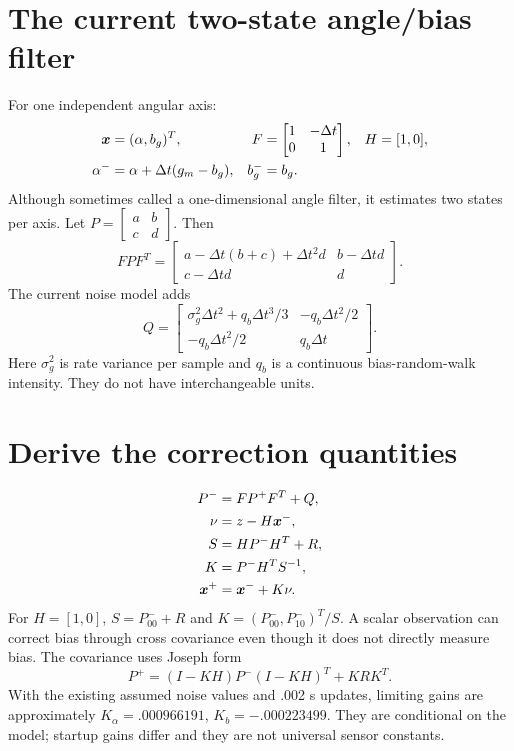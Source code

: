 \section{The current two-state angle/bias filter}
For one independent angular axis:
\begin{align}
\bm{x}&=(\alpha,b_g)^T,&
F&=\begin{bmatrix}1&-\Delta t\\0&1\end{bmatrix},&
H&=[1,0],\\
\alpha^-&=\alpha+\Delta t(g_m-b_g),&
b_g^-&=b_g.
\end{align}
Although sometimes called a one-dimensional angle filter, it estimates two
states per axis. Let $P=\begin{bmatrix}a&b\\c&d\end{bmatrix}$. Then
\begin{equation}
FPF^T=
\begin{bmatrix}
a-\Delta t(b+c)+\Delta t^2d&b-\Delta t d\\
c-\Delta t d&d
\end{bmatrix}.
\end{equation}
The current noise model adds
\begin{equation}
Q=\begin{bmatrix}
\sigma_g^2\Delta t^2+q_b\Delta t^3/3&-q_b\Delta t^2/2\\
-q_b\Delta t^2/2&q_b\Delta t
\end{bmatrix}.
\end{equation}
Here $\sigma_g^2$ is rate variance per sample and $q_b$ is a continuous
bias-random-walk intensity. They do not have interchangeable units.

\section{Derive the correction quantities}
\begin{align}
P^-&=FP^+F^T+Q,\\
\nu&=z-H\bm{x}^-,\\
S&=HP^-H^T+R,\\
K&=P^-H^TS^{-1},\\
\bm{x}^+&=\bm{x}^-+K\nu.
\end{align}
For $H=[1,0]$, $S=P_{00}^-+R$ and
$K=(P_{00}^-,P_{10}^-)^T/S$. A scalar observation can correct bias through
cross covariance even though it does not directly measure bias.
The covariance uses Joseph form
\begin{equation}
P^+=(I-KH)P^-(I-KH)^T+KRK^T.
\end{equation}
With the existing assumed noise values and .002 s updates, limiting gains are
approximately $K_\alpha=.000966191$, $K_b=-.000223499$.
They are conditional on the model; startup gains differ and they are not
universal sensor constants.

